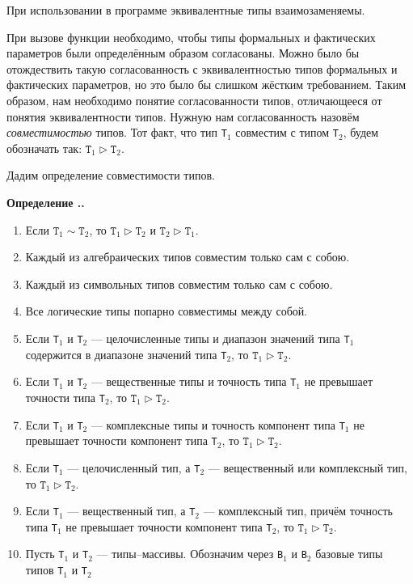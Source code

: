 \documentclass[10pt]{report}
\newcounter{defin}[section]
\renewcommand{\thedefin}{\thesection.\arabic{defin}}
\newenvironment{Definition}{\par\refstepcounter{defin}\bf Определение \thedefin.\sl}{\rm\par}
\begin{document}
При использовании в программе эквивалентные типы взаимозаменяемы.

При вызове функции необходимо, чтобы типы формальных и фактических параметров были определённым образом согласованы. Можно было бы
отождествить такую согласованность с эквивалентностью типов формальных и фактических параметров, но это было бы слишком жёстким требованием. Таким образом, нам необходимо
понятие согласованности типов, отличающееся от понятия эквивалентности типов. Нужную нам согласованность назовём \textit{совместимостью} типов. Тот факт, что тип
\texttt{T$_1$} совместим с типом \texttt{T$_2$}, будем обозначать так: ${\texttt{T}}_1\rhd{\texttt{T}}_2$.

Дадим определение совместимости типов.
\begin{Definition}
	\renewcommand{\theenumii}{\asbuk{enumii}}
	\renewcommand{\labelenumii}{\theenumii)}
	\begin{enumerate}
		\item Если ${\texttt{T}}_1\sim{\texttt{T}}_2$, то ${\texttt{T}}_1\rhd{\texttt{T}}_2$ и ${\texttt{T}}_2\rhd{\texttt{T}}_1$.
		\item Каждый из алгебраических типов совместим только сам с собою.
		\item Каждый из символьных типов совместим только сам с собою.
		\item Все логические типы попарно совместимы между собой.
		\item Если \texttt{T$_1$} и \texttt{T$_2$} --- целочисленные типы и диапазон значений типа \texttt{T$_1$} содержится в диапазоне значений типа \texttt{T$_2$},
		то ${\texttt{T}}_1\rhd{\texttt{T}}_2$.
		\item Если \texttt{T$_1$} и \texttt{T$_2$} --- вещественные типы и точность типа \texttt{T$_1$} не превышает точности типа \texttt{T$_2$}, то
		${\texttt{T}}_1\rhd{\texttt{T}}_2$.
		\item Если \texttt{T$_1$} и \texttt{T$_2$} --- комплексные типы и точность компонент типа \texttt{T$_1$} не превышает точности компонент типа \texttt{T$_2$}, то
		${\texttt{T}}_1\rhd{\texttt{T}}_2$.
		\item Если \texttt{T$_1$} --- целочисленный тип, а \texttt{T$_2$} --- вещественный или комплексный тип, то ${\texttt{T}}_1\rhd{\texttt{T}}_2$.
		\item Если \texttt{T$_1$} --- вещественный тип, а \texttt{T$_2$} --- комплексный тип, причём точность типа \texttt{T$_1$} не превышает точности компонент
		типа \texttt{T$_2$}, то ${\texttt{T}}_1\rhd{\texttt{T}}_2$.
		\item Пусть \texttt{T$_1$} и \texttt{T$_2$} --- типы--массивы. Обозначим через \texttt{B$_1$} и \texttt{B$_2$} базовые типы типов \texttt{T$_1$} и \texttt{T$_2$}

\end{enumerate}
\end{Definition}
\end{document}
